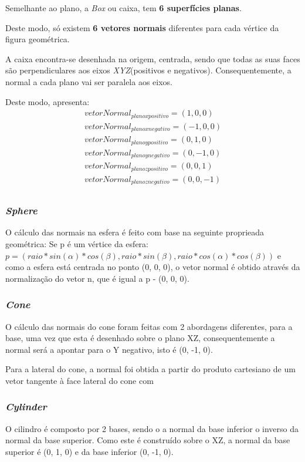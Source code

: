 \documentclass[relatorio.tex]{subfiles}
\begin{document}
Semelhante ao plano, a \textit{Box} ou caixa, 
tem \textbf{6 superfícies planas}.

Deste modo, só existem \textbf{6 vetores normais} 
diferentes para cada vértice da figura geométrica.

A caixa encontra-se desenhada na origem, centrada,
sendo que todas as suas faces são perpendiculares
aos eixos \textit{XYZ}(positivos e negativos).
Consequentemente, a normal a cada plano vai ser 
paralela aos eixos.

Deste modo, apresenta:
\begin{eqnarray}
    vetorNormal_{plano x positivo} = (1,0,0) \\
    vetorNormal_{plano x negativo} = (-1,0,0) \\
    vetorNormal_{plano y positivo} = (0,1,0) \\
    vetorNormal_{plano y negativo} = (0,-1,0) \\
    vetorNormal_{plano z positivo} = (0,0,1) \\
    vetorNormal_{plano z negativo} = (0,0,-1) \\
\end{eqnarray}

\subsubsection{\textit{Sphere}}
O cálculo das normais na esfera é feito com base na seguinte proprieada
geométrica:
Se p é um vértice da esfera:
$ p = (raio * sin(\alpha) * cos(\beta), raio * sin(\beta), raio * cos(\alpha) * cos(\beta))$
e como a esfera está centrada no ponto (0, 0, 0), o vetor normal é obtido através
da normalização do vetor n, que é igual a p - (0, 0, 0).

\subsubsection{\textit{Cone}}
O cálculo das normais do cone foram feitas com 2 abordagens diferentes,
para a base, uma vez que esta é desenhado sobre o plano XZ, consequentemente
a normal será a apontar para o Y negativo, isto é (0, -1, 0).

Para a lateral do cone, a normal foi obtida a partir do produto cartesiano
de um vetor tangente à face lateral do cone com 

\subsubsection{\textit{Cylinder}}
O cilindro é composto por 2 bases, sendo o a normal da base inferior o inverso
da normal da base superior. Como este é construído sobre o XZ, a normal da base superior
é (0, 1, 0) e da base inferior (0, -1, 0).
\end{document}
